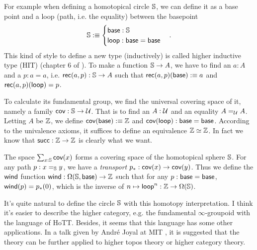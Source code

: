 For example when defining a homotopical circle $\mathbb{S}$, we can define 
it as a base point and a loop (path, i.e. the equality) between the 
basepoint
\newcommand{\base}{\name{base}}
\newcommand{\nloop}{\name{loop}}
$$
    \sphere\defn\begin{cases}
        \base: \sphere \\
        \nloop: \base=\base \\
    \end{cases}.
$$
This kind of style to define a new type (inductively) is called higher
inductive type (HIT) (chapter 6 of \cite{homotopy-type-theory}).
To make a function $\mathbb{S}\to A$, we have to find an $a:A$ and
a $p: a=a$, i.e. $\text{\sf rec}(a, p): \mathbb{S}\to A$ such that 
$\rec(a,p)(\base)\defn a$ and $\rec(a,p)(\nloop)=p$. 

To calculate its fundamental group, we find the universal covering space 
of it, namely a family $\text{\sf cov}:\mathbb{S}\to\mathcal{U}$. That is to
find an $A: \mathcal{U}$ and an equality $A=_{\mathcal{U}} A$. Letting $A$
be $\mathbb{Z}$, we define $\name{cov}(\base)\defn\integer$ and 
$\name{cov}(\nloop):\base=\base$. According to the univalence axioms,
it suffices to define an equivalence $\mathbb{Z}\simeq\mathbb{Z}$. In fact
we know that $\text{\sf succ}: \mathbb{Z}\to\mathbb{Z}$ is clearly what we want.

The space $\sum_{x:\mathbb{S}}\text{\sf cov}(x)$ forms a covering space of
the homotopical sphere $\mathbb{S}$. For any path $p:x=_{\mathbb{S}} y$,
we have a {\it transport} $p_\ast:\text{\sf cov}(x)\to \text{\sf cov}(y)$.
Thus we define the $\text{\sf wind}$
function $\name{wind}: \Omega(\sphere,\base)\to\integer$ such that
for any $p:\base=\base$, $\text{\sf wind}(p)=p_\ast(0)$, which is the
inverse of $n\mapsto \nloop^n: \integer\to\Omega(\sphere)$.

It's quite natural to define the circle $\mathbb{S}$ with this homotopy
interpretation. I think it's easier to describe the higher category,
e.g. the fundamental $\infty$-groupoid with the language of HoTT. 
Besides, it seems that this language has some other applications.
In a talk given by Andr\'e Joyal at MIT \cite{joyal2014categorical}, 
it is suggested that the theory can be further applied to higher topos 
theory or higher category theory.
